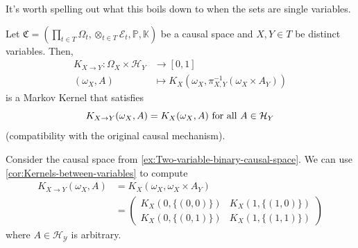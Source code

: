 \documentclass[../main.tex]{subfiles}
\begin{document}
    It's worth spelling out what this boils down to when the sets are single variables. 
    \begin{cor}\label{cor:Kernels-between-variables}
    Let ${\mathfrak{C} = (\prod_{t\in T}\Omega_t, \otimes_{t\in T}\mathcal{E}_t, \mathbb{P}, \mathbb{K})}$ be a causal space and ${X,Y\in T}$ be distinct variables. Then, 
    \begin{align*}
    K_{X\to Y}: \Omega_X\times \mathcal{H}_Y &\to [0,1]\\
                (\omega_X, A)&\mapsto K_X(\omega_X, \pi_{X,Y}^{-1}(\omega_X\times A_Y))
    \end{align*}
    is a Markov Kernel that satisfies 
         $${K_{X\to Y}(\omega_X, A) = K_X(\omega_X, A)\text{ for all } A \in \mathcal{H}_Y}$$ (compatibility with the original causal mechanism).
    \end{cor}
    \begin{ex}
    \label{ex:Kernels-between-variables-in-the-two-binary-variable-case}
        Consider the causal space from \autoref{ex:Two-variable-binary-causal-space}. We can use \autoref{cor:Kernels-between-variables} to compute
        \begin{align*}
            K_{X\to Y}(\omega_X, A) &=  K_X(\omega_X, \omega_X\times A_Y)\\
                                    &=  \begin{pmatrix}
                                        K_X(0, \{(0,0)\}) & K_X(1, \{(1,0)\})\\
                                        K_X(0, \{(0,1)\}) & K_X(1, \{(1,1)\})
                                    \end{pmatrix}             
        \end{align*}
        where ${A\in \mathcal{H_Y}}$ is arbitrary. 
    \end{ex}
\end{document}
